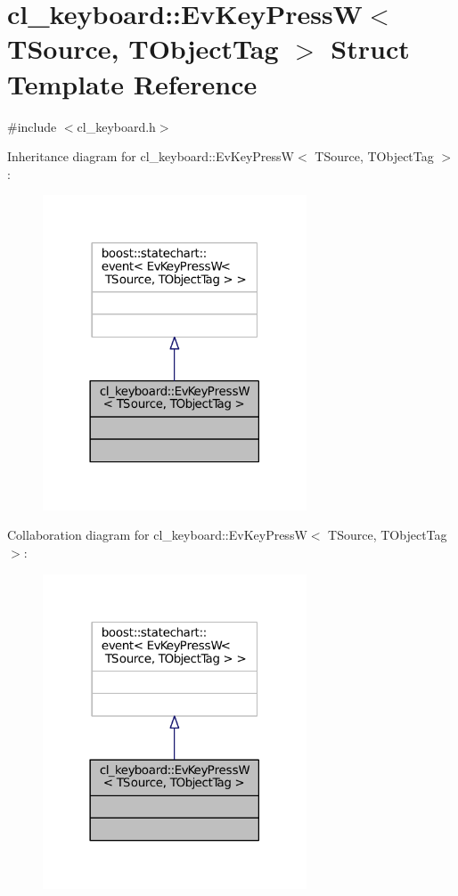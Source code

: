 \hypertarget{structcl__keyboard_1_1EvKeyPressW}{}\section{cl\+\_\+keyboard\+:\+:Ev\+Key\+PressW$<$ T\+Source, T\+Object\+Tag $>$ Struct Template Reference}
\label{structcl__keyboard_1_1EvKeyPressW}


{\ttfamily \#include $<$cl\+\_\+keyboard.\+h$>$}



Inheritance diagram for cl\+\_\+keyboard\+:\+:Ev\+Key\+PressW$<$ T\+Source, T\+Object\+Tag $>$\+:
\nopagebreak
\begin{figure}[H]
\begin{center}
\leavevmode
\includegraphics[width=222pt]{structcl__keyboard_1_1EvKeyPressW__inherit__graph}
\end{center}
\end{figure}


Collaboration diagram for cl\+\_\+keyboard\+:\+:Ev\+Key\+PressW$<$ T\+Source, T\+Object\+Tag $>$\+:
\nopagebreak
\begin{figure}[H]
\begin{center}
\leavevmode
\includegraphics[width=222pt]{structcl__keyboard_1_1EvKeyPressW__coll__graph}
\end{center}
\end{figure}


